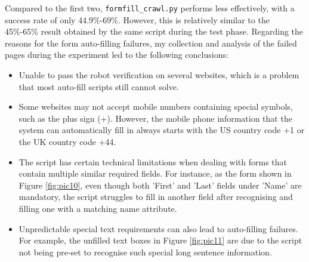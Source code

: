 \documentclass[ oneside,%
                    author={Cassie Qing Tang},
                    degree={BSc},
                     title={An Automated Response System for Disrupting Online Pet Scamming \\ },
                    subtitle={ }]{dissertation}
\begin{document}
Compared to the first two, \texttt{formfill\_crawl.py} performs less effectively, with a success rate of only 44.9\%-69\%. However, this is relatively similar to the 45\%-65\% result obtained by the same script during the test phase. Regarding the reasons for the form auto-filling failures, my collection and analysis of the failed pages during the experiment led to the following conclusions:
\begin{itemize}
  \item Unable to pass the robot verification on several websites, which is a problem that most auto-fill scripts still cannot solve.
  \item Some websites may not accept mobile numbers containing special symbols, such as the plus sign (+). However, the mobile phone information that the system can automatically fill in always starts with the US country code +1 or the UK country code +44.
  \item The script has certain technical limitations when dealing with forms that contain multiple similar required fields. For instance, as the form shown in Figure \ref{fig:pic10}, even though both 'First' and 'Last' fields under 'Name' are mandatory, the script struggles to fill in another field after recognising and filling one with a matching name attribute.
  \item Unpredictable special text requirements can also lead to auto-filling failures. For example, the unfilled text boxes in Figure \ref{fig:pic11} are due to the script not being pre-set to recognise such special long sentence information.
\end{itemize}
\end{document}
